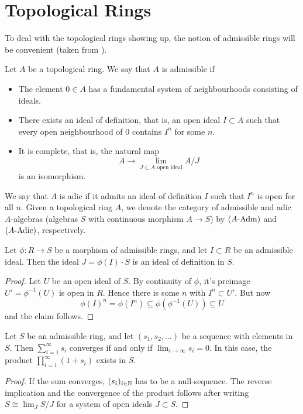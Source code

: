 \documentclass[../main.tex]{subfiles}
\begin{document}
\section{Topological Rings}
To deal with the topological rings showing up, the notion of admissible rings
will be convenient (taken from \cite[Tag 07E8]{stacks-project}).
\begin{defi}\label{def:admring}
  Let $A$ be a topological ring. We say that $A$ is admissible if
  \begin{itemize}
    \item The element $0 \in A$ has a fundamental system of neighbourhoods
      consisting of ideals.
    \item There exists an ideal of definition, that is, an open ideal $I
      \subset A$ such that every open neighbourhood of $0$ contains $I^n$ for
      some $n$.
    \item It is complete, that is, the natural map
      \begin{equation*}
        A \to \lim_{J \subset A \text{ open ideal}} A/J
      \end{equation*}
      is an isomorphism.
  \end{itemize}
  We say that $A$ is adic if it admits an ideal of definition $I$ such that 
  $I^n$ is open for all $n$.
  Given a topological ring $A$, we denote the category of admissible 
  and adic $A$-algebras (algebras $S$ with continuous morphism $A \to S$) by
  ${({A}\text-\mathrm{Adm})}$ and ${({A}\text-\mathrm{Adic})}$, respectively.
\end{defi}


\begin{lem} \label{lem:iodimage}
  Let $\phi: R \to S$ be a morphism of admissible rings, and let $I \subset R$ be an 
  admissible ideal. Then the ideal $J = \phi(I) \cdot S$ is an ideal of definition in 
  $S$.
\begin{proof}
  Let $U$ be an open ideal of $S$. By continuity of $\phi$, it's preimage
  $U' = \phi^{-1}(U)$ is open in $R$. Hence there is some $n$ with 
  $I^n \subset U'$. But now 
  $$\phi(I)^n = \phi(I^n) \subseteq \phi(\phi^{-1}(U)) \subseteq U$$
  and the claim follows.
\end{proof}
\end{lem}

\begin{lem}\label{lem:infiniteseriesandproducts}
  Let $S$ be an admissible ring, and let $(s_1, s_2, \dots)$ be a sequence with
  elements in $S$. Then $\sum_{i = 1}^\infty s_i$ converges if and only if 
   $\lim_{i \to \infty} s_i = 0$. In this case, the product $\prod_{i=1}^\infty (1 + s_i)$
   exists in $S$.
\begin{proof}
  If the sum converges, $(s_i)_{i \in \mathbb{N}}$ has to be a null-sequence. The
  reverse implication and the convergence of the product follows after writing
  $S \cong \lim_{J} S/J$ for a system of open ideals $J \subset S$. 
\end{proof}

\end{lem}
\end{document}

